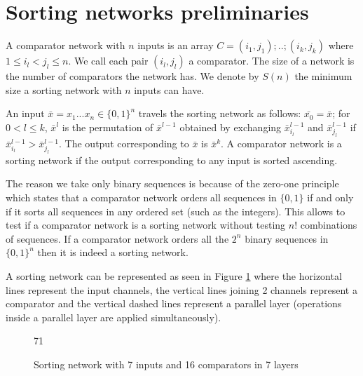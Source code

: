 \documentclass[../main.tex]{subfiles}
\begin{document}
	\section{Sorting networks preliminaries}
	A comparator network with $n$ inputs is an array $C=(i_1,j_1);..;(i_k,j_k)$ where $1 \leq i_l < j_l \leq n$.
	We call each pair $(i_l,j_l)$ a comparator. The size of a network is the number of comparators the network has. We denote by $S(n)$ the minimum size a sorting network with $n$ inputs can have.
	
	An input $\bar{x}=x_1...x_n \in \{0, 1\}^n$ travels the sorting network as follows: $\bar{x_0}=\bar{x}$; for $0<l\leq k$, $\bar x^l$ is the permutation of $\bar x^{l-1}$ obtained by exchanging $\bar x^{l-1}_{i_l}$ and $\bar x^{l-1}_{j_l}$ if $\bar x^{l-1}_{i_l} > \bar x^{l-1}_{j_l}$. The output corresponding to $\bar x$ is $\bar x^k$.
	A comparator network is a sorting network if the output corresponding to any input is sorted ascending. 
	
	The reason we take only binary sequences is because of the zero-one principle \cite{knuth1997art} which states that a comparator network orders all sequences in $\{0,1\}$ if and only if it sorts all sequences in any ordered set (such as the integers). This allows to test if a comparator network is a sorting network without testing $n!$ combinations of sequences. If a comparator network orders all the $2^n$ binary sequences in ${\{0,1\}}^n$ then it is indeed a sorting network.
	
	A sorting network can be represented as seen in Figure \ref{sortingNetwork1} where the horizontal lines represent the input channels, the vertical lines joining 2 channels represent a comparator and the vertical dashed lines represent a parallel layer (operations inside a parallel layer are applied simultaneously).
	
	\begin{figure}[H]
		\centering
		\begin{sortingnetwork}7{1}
			\nextlayer
			\addlayer
			\nextlayer
			\nextlayer
			\nextlayer
			\addlayer
			\nextlayer
			\nextlayer
			\nextlayer
		\end{sortingnetwork}
		\caption{Sorting network with 7 inputs and 16 comparators in 7 layers}
		\label{sortingNetwork1}
	\end{figure}
\end{document}
